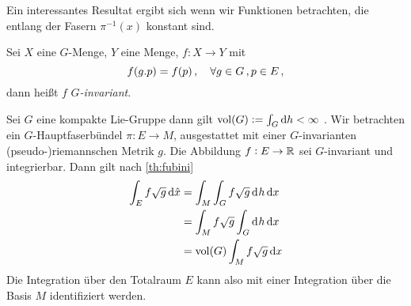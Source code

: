 Ein interessantes Resultat ergibt sich wenn wir Funktionen betrachten, die
entlang der Fasern $\pi^{-1}(x)$ konstant sind.
\begin{definition}
Sei $X$ eine $G$-Menge, $Y$ eine Menge, $f:X\to Y$ mit
\begin{equation}
f(g. p)=f(p)\,,\quad \forall g\in G\,,p\in E\,,
\end{equation}
dann heißt $f$ \emph{$G$-invariant}.
\end{definition}
Sei $G$ eine kompakte Lie-Gruppe dann gilt $\vol(G):=\int_G\dif h<\infty$
.
Wir betrachten ein $G$-Hauptfaserbündel $\pi: E\to M$,
ausgestattet mit einer $G$-invarianten {(pseudo-)riemannschen} Metrik $g$.
Die Abbildung $f:E\to \mathbb{R}$ sei $G$-invariant und integrierbar. Dann gilt nach
\autoref{th:fubini}
\begin{equation}
\begin{split}
\int_E f\sqrt{g}\dif{}\hat{x}&=\int_{M}\int_{G}f\sqrt{g}\dif^{}h \dif x\\
&=\int_{M}f\sqrt{g}\int_{G}\dif^{}h \dif x\\
&=\vol(G)\int_{M}f\sqrt{g} \dif x\\
\end{split}
\end{equation}
Die Integration über den Totalraum $E$ kann also mit einer Integration über die
Basis $M$ identifiziert werden.

